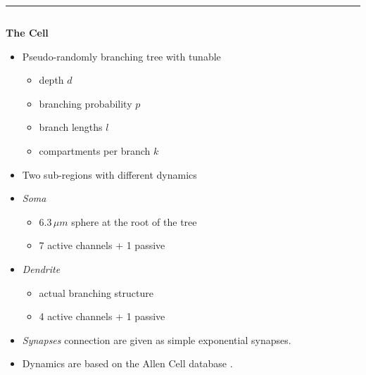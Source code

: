 \documentclass{beamer}
\begin{document}
\begin{frame}[t, fragile]
  \vspace*{1ex}
  \textcolor{arbred}{\rule{\textwidth}{0.5ex}}
  \vspace*{-1ex}
  \begin{columns}[t]
    \begin{column}[T]{0.25\textwidth}
      \textbf{The Cell}
      \begin{itemize}
        \item Pseudo-randomly branching tree with tunable
        \begin{itemize}
          \item depth $d$
          \item branching probability $p$
          \item branch lengths $l$
          \item compartments per branch $k$
        \end{itemize}
        \item Two sub-regions with different dynamics
        \item \emph{Soma}
        \begin{itemize}
          \item $6.3\,\mu m$ sphere at the root of the tree
          \item 7 active channels + 1 passive
        \end{itemize}
        \item \emph{Dendrite}
        \begin{itemize}
          \item actual branching structure
          \item 4 active channels + 1 passive
        \end{itemize}
        \item \emph{Synapses} connection are given as simple exponential
              synapses.
        \item Dynamics are based on the Allen Cell database \cite{allen-v1}.
      \end{itemize}
    \end{column}
    \begin{column}[T]{0.45\textwidth}
      \centering
\end{column}
\end{columns}
\end{frame}
\end{document}
